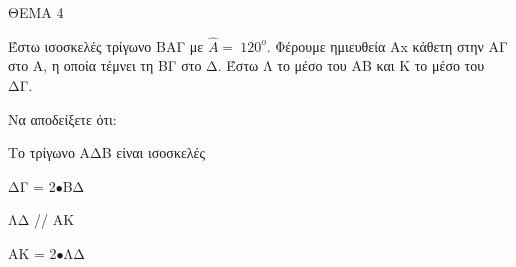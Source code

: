 
ΘΕΜΑ 4

Έστω ισοσκελές τρίγωνο ΒΑΓ με $\widehat{Α} = \ 120^{ο}$. Φέρουμε ημιευθεία Αx κάθετη στην ΑΓ στο Α, η οποία τέμνει τη ΒΓ στο Δ. Έστω Λ το μέσο του ΑΒ και Κ το μέσο του ΔΓ.

Να αποδείξετε ότι:

\begin{alist}
\item Το τρίγωνο ΑΔΒ είναι ισοσκελές 

\item ΔΓ = 2$\bullet$ΒΔ 

\item ΛΔ // ΑΚ 

\item ΑΚ = 2$\bullet$ΛΔ 


\end{alist}
